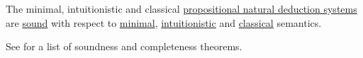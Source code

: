 \begin{theorem}\label{thm:propositional_natural_deduction_soundness}
  The minimal, intuitionistic and classical \hyperref[def:propositional_natural_deduction_systems]{propositional natural deduction systems} are \hyperref[def:abstract_logic/soundness]{sound} with respect to \hyperref[def:minimal_propositional_semantics]{minimal}, \hyperref[def:propositional_semantics/intuitionistic]{intuitionistic} and \hyperref[def:propositional_semantics/classical]{classical} semantics.
\end{theorem}
\begin{comments}
  \item See  for a list of soundness and completeness theorems.
\end{comments}
